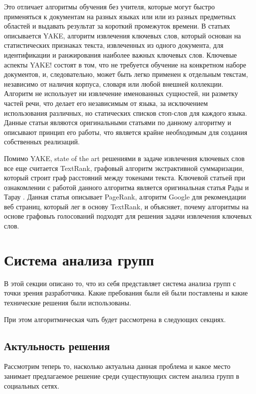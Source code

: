 \documentclass[14pt]{matmex-diploma-custom}
\begin{document}
Это отличает алгоритмы обучения без учителя, которые могут быстро применяться к документам на разных языках или или из разных предметных областей и выдавать результат за короткий промежуток времени. В статьях \cite{yake1, yake2} описывается YAKE, алгоритм извлечения ключевых слов, который основан на статистических признаках текста, извлеченных из одного документа, для идентификации и ранжирования наиболее важных ключевых слов. Ключевые аспекты YAKE! состоят в том, что не требуется обучение на конкретном наборе документов, и, следовательно, может быть легко применен к отдельным текстам, независимо от наличия корпуса, словаря или любой внешней коллекции. Алгоритм не использует ни извлечение именованных сущностей, ни разметку частей речи, что делает его независимым от языка, за исключением использования различных, но статических списков стоп-слов для каждого языка. Данные статьи являются оригинальными статьями по данному алгоритму и описывают принцип его работы, что является крайне необходимым для создания собственных реализаций.

Помимо YAKE, state of the art решениями в задаче извлечения ключевых слов все еще считается TextRank, графовый алгоритм экстрактивной суммаризации, который строит граф расстояний между токенами текста. Ключевой статьей при ознакомлении с работой данного алгоритма является оригинальная статья Рады и Тарау \cite{TextrankOriginal}. Данная статья описывает PageRank, алгоритм Google для рекомендации веб страниц, который лег в основу TextRank, и объясняет, почему алгоритмы на основе графовыъ голосований подходят для решения задачи извлечения ключевых слов.

\section{Система анализа групп}

В этой секции описано то, что из себя представляет система анализа групп с точки зрения разработчика.
Какие пребования были ей были поставлены и какие технические решения были использованы.

При этом алгоритмическая чать будет рассмотрена в следующих секциях.

\subsection{Актульность решения}
Рассмотрим теперь то, насколько актуальна данная проблема 
и какое место занимает предлагаемое решение среди существующих систем анализа
групп в социальных сетях.
\end{document}
